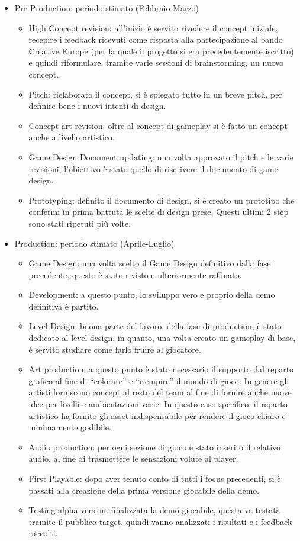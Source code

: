 \begin{itemize}

\item Pre Production: periodo stimato (Febbraio-Marzo)

\begin{itemize}
\item High Concept revision: all'inizio è servito rivedere il concept iniziale, recepire i feedback ricevuti come risposta alla partecipazione al bando Creative Europe (per la quale il progetto si era precedentemente iscritto) e quindi riformulare, tramite varie sessioni di brainstorming, un nuovo concept.
\item Pitch: rielaborato il concept, si è spiegato tutto in un breve pitch, per definire bene i nuovi intenti di design.
\item Concept art revision: oltre al concept di gameplay si è fatto un concept anche a livello artistico.
\item Game Design Document updating: una volta approvato il pitch e le varie revisioni, l'obiettivo è stato quello di riscrivere il documento di game design.
\item Prototyping: definito il documento di design, si è creato un prototipo che confermi in prima battuta le scelte di design prese. Questi ultimi 2 step sono stati ripetuti più volte.
\end{itemize}

\item Production: periodo stimato (Aprile-Luglio)

\begin{itemize}
\item Game Design: una volta scelto il Game Design definitivo dalla fase precedente, questo è stato rivisto e ulteriormente raffinato.
\item Development: a questo punto, lo sviluppo vero e proprio della demo definitiva è partito.
\item Level Design: buona parte del lavoro, della fase di production, è stato dedicato al level design, in quanto, una volta creato un gameplay di base, è servito studiare come farlo fruire al giocatore.
\item Art production: a questo punto è stato necessario il supporto dal reparto grafico al fine di ``colorare'' e ``riempire'' il mondo di gioco. In genere gli artisti forniscono concept al resto del team al fine di fornire anche nuove idee per livelli e ambientazioni varie. In questo caso specifico, il reparto artistico ha fornito gli asset indispensabile per rendere il gioco chiaro e minimamente godibile.
\item Audio production: per ogni sezione di gioco è stato inserito il relativo audio, al fine di trasmettere le sensazioni volute al player.
\item First Playable: dopo aver tenuto conto di tutti i focus precedenti, si è passati alla creazione della prima versione giocabile della demo.
\item Testing alpha version: finalizzata la demo giocabile, questa va testata tramite il pubblico target, quindi vanno analizzati i risultati e i feedback raccolti.
\end{itemize}


\end{itemize}

